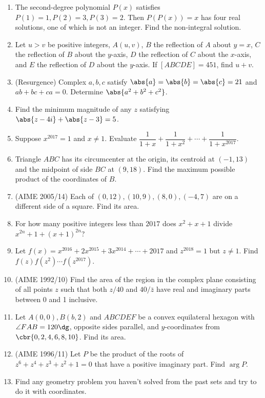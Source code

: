 \documentclass[10pt,paper=letter]{scrartcl}
\begin{document}
\begin{enumerate}
  \item The second-degree polynomial $P(x)$ satisfies $P(1) = 1, P(2) = 3, P(3) = 2$. Then $P(P(x)) = x$ has four real solutions, one of which is not an integer. Find the non-integral solution.
  \item Let $u > v$ be positive integers, $A(u, v)$, $B$ the reflection of $A$ about $y = x$, $C$ the reflection of $B$ about the $y$-axis, $D$ the reflection of $C$ about the $x$-axis, and $E$ the reflection of $D$ about the $y$-axis. If $[ABCDE]=451$, find $u+v$.
  \item (Resurgence) Complex $a, b, c$ satisfy $\abs{a} = \abs{b} = \abs{c} = 21$ and $ab + bc + ca = 0$. Determine $\abs{a^2 + b^2 + c^2}$.
  \item Find the minimum magnitude of any $z$ satisfying $\abs{z-4i} + \abs{z - 3} = 5$.
  \item Suppose $x^{2017} = 1$ and $x \neq 1$. Evaluate $\dfrac1{1+x} + \dfrac1{1+x^2} + \cdots + \dfrac1{1+x^{2017}}$.
  \item Triangle $ABC$ has its circumcenter at the origin, its centroid at $(-1, 13)$ and the midpoint of side $BC$ at $(9, 18)$. Find the maximum possible product of the coordinates of $B$.
  \item (AIME 2005/14) Each of $(0, 12), (10, 9), (8, 0), (-4, 7)$ are on a different side of a square. Find its area.
  \item For how many positive integers less than $2017$ does $x^2 + x + 1$ divide $x^{2n} + 1 + (x + 1)^{2n}$?
  \item Let $f(x) = x^{2016} + 2x^{2015} + 3x^{2014} + \cdots + 2017$ and $z^{2018} = 1$ but $z \neq 1$. Find $f(z)f(z^2)\cdots f(z^{2017})$.
  \item (AIME 1992/10) Find the area of the region in the complex plane consisting of all points $z$ such that both $z/40$ and $40/\bar{z}$ have real and imaginary parts between 0 and 1 inclusive.
  \item Let $A(0, 0), B(b, 2)$ and $ABCDEF$ be a convex equilateral hexagon with $\angle FAB = 120\dg$, opposite sides parallel, and $y$-coordinates from $\cbr{0, 2, 4, 6, 8, 10}$. Find its area.
  \item (AIME 1996/11) Let $P$ be the product of the roots of $z^6 + z^4 + z^3 + z^2 + 1 = 0$ that have a positive imaginary part. Find $\arg P$.
  \item Find any geometry problem you haven't solved from the past sets and try to do it with coordinates.
\end{enumerate}
\end{document}
